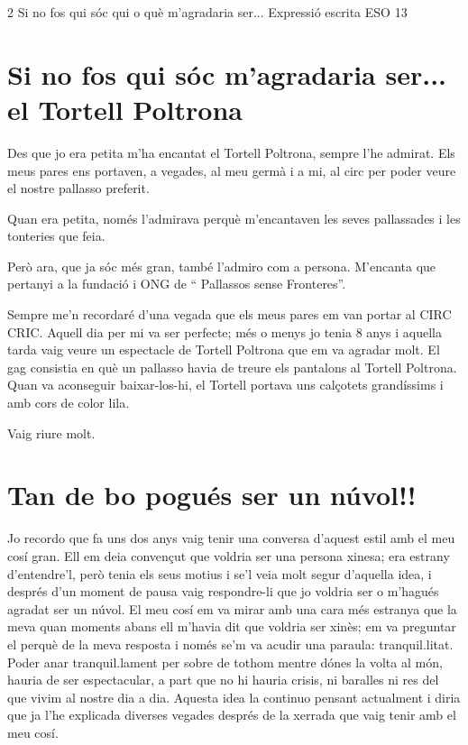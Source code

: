 %
%
\begin{news}
{2} %
{Si no fos qui sóc qui o què m'agradaria ser...}
{Expressió escrita}
{ESO}
{13} %

\section*{Si no fos qui sóc m'agradaria ser... el Tortell Poltrona}

Des que jo era petita m'ha encantat el Tortell Poltrona, sempre l'he admirat. Els meus pares ens portaven, a vegades, al meu germà i a mi,  al circ per poder veure el nostre pallasso preferit.

Quan era petita, només l'admirava perquè m'encantaven les seves pallassades i les tonteries que feia.

Però ara, que ja sóc més gran, també l'admiro com a persona. M'encanta que pertanyi a la fundació i ONG de “ Pallassos sense Fronteres”.

Sempre me'n recordaré d'una vegada que els meus pares em van portar al CIRC CRIC. Aquell dia per  mi va ser perfecte; més o menys jo tenia 8 anys i aquella tarda vaig veure un espectacle de Tortell Poltrona que em va agradar molt. El gag consistia en què un pallasso havia de treure els pantalons al Tortell Poltrona. Quan va aconseguir baixar-los-hi, el Tortell portava uns calçotets grandíssims i amb cors de color lila. 

Vaig riure molt. 


\section*{Tan de bo pogués ser un núvol!!}

Jo recordo que fa uns dos anys vaig tenir una conversa d’aquest estil amb el meu cosí gran. Ell em deia convençut que voldria ser una persona xinesa; era estrany d’entendre’l, però tenia els seus motius i se’l veia molt segur d’aquella idea, i després d’un moment de pausa vaig respondre-li que jo voldria ser o m’hagués agradat ser un núvol. El meu cosí em va mirar amb una cara més estranya que la meva quan moments abans ell m’havia dit que voldria ser xinès; em va preguntar el perquè de la meva resposta i només se’m va acudir una paraula: tranquil.litat. Poder anar tranquil.lament per sobre de tothom mentre dónes la volta al món, hauria de ser espectacular, a part que no hi hauria crisis, ni baralles ni res del que vivim al nostre dia a dia. Aquesta idea la continuo pensant  actualment i diria que ja l’he explicada diverses vegades després de la xerrada que vaig tenir amb el meu cosí.



\end{news}
